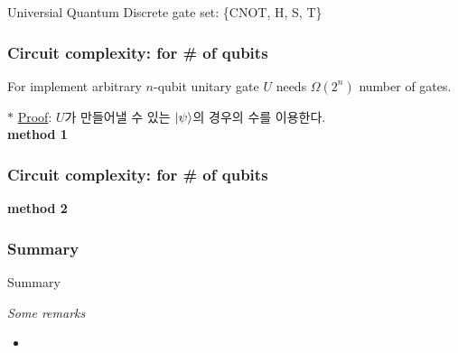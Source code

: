 \documentclass[9pt]{beamer}
\begin{document}
\begin{section}{Universial Quantum Discrete gate set: \{CNOT, H, S, T\}}
        \begin{frame}
            \frametitle{Circuit complexity: for \# of qubits}
            \begin{theorem}
                For implement arbitrary $n$-qubit unitary gate $U$ needs $\Omega(2^n)$ number of gates.
            \end{theorem}
            \vspace{0.2cm}
            $\ast$ \underline{Proof}: $U$가 만들어낼 수 있는 $\ket \psi$의 경우의 수를 이용한다.
            \\ \textbf{method 1}
        \end{frame}

        \begin{frame}
            \frametitle{Circuit complexity: for \# of qubits}
            \textbf{method 2}
        \end{frame}

        \begin{frame}
            \frametitle{Summary}
            \begin{block}{Summary}
                
            \end{block}
            \vspace{0.2cm}
            \textit{Some remarks}
            \begin{itemize}
                \item 
            \end{itemize}
        
        \end{frame}
    \end{section}
    
\end{document}
